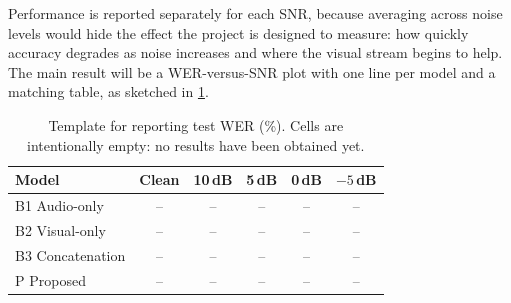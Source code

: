Performance is reported separately for each SNR, because averaging across noise
levels would hide the effect the project is designed to measure: how quickly
accuracy degrades as noise increases and where the visual stream begins to
help. The main result will be a WER-versus-SNR plot with one line per model and a
matching table, as sketched in \cref{tab:results-template}.

\begin{table}[H]
\centering
\caption{Template for reporting test WER (\%). Cells are intentionally empty: no
results have been obtained yet.}
\label{tab:results-template}
\small
\begin{tabular}{@{}lccccc@{}}
\toprule
\textbf{Model} & \textbf{Clean} & \textbf{10\,dB} & \textbf{5\,dB} & \textbf{0\,dB} & \textbf{$-5$\,dB} \\
\midrule
B1 Audio-only        & -- & -- & -- & -- & -- \\
B2 Visual-only       & -- & -- & -- & -- & -- \\
B3 Concatenation     & -- & -- & -- & -- & -- \\
P  Proposed          & -- & -- & -- & -- & -- \\
\bottomrule
\end{tabular}
\end{table}

